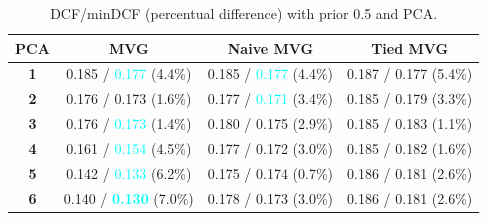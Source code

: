 \documentclass[12pt]{report}
\begin{document}
\begin{table}[H]
    \centering
    \begin{tabular}{|c|c|c|c|}
        \hline
        \rowcolor{blue!10}
        \textbf{PCA} & \textbf{MVG}                                     & \textbf{Naive MVG}                      & \textbf{Tied MVG}     \\
        \hline
        \textbf{1}   & 0.185 / \textcolor{cyan}{0.177} (4.4\%)          & 0.185 / \textcolor{cyan}{0.177} (4.4\%) & 0.187 / 0.177 (5.4\%) \\
        \hline
        \textbf{2}   & 0.176 / 0.173 (1.6\%)                            & 0.177 / \textcolor{cyan}{0.171} (3.4\%) & 0.185 / 0.179 (3.3\%) \\
        \hline
        \textbf{3}   & 0.176 / \textcolor{cyan}{0.173} (1.4\%)          & 0.180 / 0.175 (2.9\%)                   & 0.185 / 0.183 (1.1\%) \\
        \hline
        \textbf{4}   & 0.161 / \textcolor{cyan}{0.154} (4.5\%)          & 0.177 / 0.172 (3.0\%)                   & 0.185 / 0.182 (1.6\%) \\
        \hline
        \textbf{5}   & 0.142 / \textcolor{cyan}{0.133} (6.2\%)          & 0.175 / 0.174 (0.7\%)                   & 0.186 / 0.181 (2.6\%) \\
        \hline
        \textbf{6}   & 0.140 / \textcolor{cyan}{\textbf{0.130}} (7.0\%) & 0.178 / 0.173 (3.0\%)                   & 0.186 / 0.181 (2.6\%) \\
        \hline
    \end{tabular}
    \caption{DCF/minDCF (percentual difference) with prior 0.5 and PCA.}
    \label{tab:DCF_MVG_PCA_0.5}
\end{table}
\end{document}
